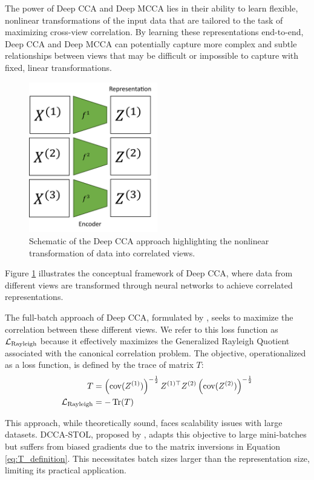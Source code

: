 The power of Deep CCA and Deep MCCA lies in their ability to learn flexible, nonlinear transformations of the input data that are tailored to the task of maximizing cross-view correlation. By learning these representations end-to-end, Deep CCA and Deep MCCA can potentially capture more complex and subtle relationships between views that may be difficult or impossible to capture with fixed, linear transformations.

\begin{figure}
    \centering
    \includegraphics[width=0.5\textwidth]{figures/dcca_schematic}
    \caption{Schematic of the Deep CCA approach highlighting the nonlinear transformation of data into correlated views.}
    \label{fig:dcca_schematic}
\end{figure}

Figure \ref{fig:dcca_schematic} illustrates the conceptual framework of Deep CCA, where data from different views are transformed through neural networks to achieve correlated representations.

The full-batch approach of Deep CCA, formulated by \citet{andrew2013deep}, seeks to maximize the correlation between these different views.
We refer to this loss function as $\mathcal{L}_\text{Rayleigh}$ because it effectively maximizes the Generalized Rayleigh Quotient associated with the canonical correlation problem.
The objective, operationalized as a loss function, is defined by the trace of matrix $T$:
\begin{align}\label{eq:T_definition}
    T          & = \left(\text{cov}(Z^{(1)})\right)^{-\frac{1}{2}} Z^{(1)\top} Z^{(2)} \left(\text{cov}(Z^{(2)})\right)^{-\frac{1}{2}} \\
    \mathcal{L}_\text{Rayleigh} & = -\operatorname{Tr}(T)
\end{align}

This approach, while theoretically sound, faces scalability issues with large datasets.
DCCA-STOL, proposed by \citet{wang2015unsupervised}, adapts this objective to large mini-batches but suffers from biased gradients due to the matrix inversions in Equation \eqref{eq:T_definition}.
This necessitates batch sizes larger than the representation size, limiting its practical application.

